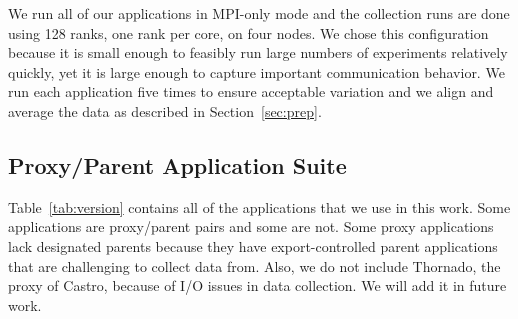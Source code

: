 \documentclass[conference]{IEEEtran}
\begin{document}
We run all of our applications in MPI-only mode and the collection
runs are done using 128 ranks, one rank per core, on four nodes.
We chose this configuration because it is small enough to feasibly 
run large numbers of experiments relatively quickly, yet it is large 
enough to capture important communication behavior.  We run each application
five times to ensure acceptable variation and we align and average the data 
as described in Section~\ref{sec:prep}.


\subsection{Proxy/Parent Application Suite}
Table~\ref{tab:version} contains all of the applications that we use in this work. Some applications are proxy/parent pairs and some are not.
Some proxy applications lack designated parents because they have export-controlled parent applications that are challenging to collect data from. Also, we do not include Thornado, the proxy of Castro, because of I/O issues in data collection. We will add it in future work.
\end{document}
